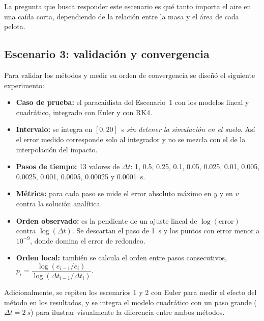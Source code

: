La pregunta que busca responder este escenario es qué tanto importa el aire en una caída corta, dependiendo de la relación entre la masa y el área de cada pelota.

\subsection{Escenario 3: validación y convergencia}
\label{sec:diseno-convergencia}

Para validar los métodos y medir su orden de convergencia se diseñó el siguiente experimento:
\begin{itemize}
  \item \textbf{Caso de prueba:} el paracaidista del Escenario~1 con los modelos lineal y cuadrático, integrado con Euler y con RK4.
  \item \textbf{Intervalo:} se integra en $[0, 20]$~s \emph{sin detener la simulación en el suelo}. Así el error medido corresponde solo al integrador y no se mezcla con el de la interpolación del impacto.
  \item \textbf{Pasos de tiempo:} 13 valores de $\Delta t$: 1, 0.5, 0.25, 0.1, 0.05, 0.025, 0.01, 0.005, 0.0025, 0.001, 0.0005, 0.00025 y 0.0001~s.
  \item \textbf{Métrica:} para cada paso se mide el error absoluto máximo en $y$ y en $v$ contra la solución analítica.
  \item \textbf{Orden observado:} es la pendiente de un ajuste lineal de $\log(\text{error})$ contra $\log(\Delta t)$. Se descartan el paso de \qty{1}{s} y los puntos con error menor a $10^{-9}$, donde domina el error de redondeo.
  \item \textbf{Orden local:} también se calcula el orden entre pasos consecutivos,
  $p_i = \dfrac{\log(e_{i-1}/e_i)}{\log(\Delta t_{i-1}/\Delta t_i)}$.
\end{itemize}
Adicionalmente, se repiten los escenarios 1 y 2 con Euler para medir el efecto del método en los resultados, y se integra el modelo cuadrático con un paso grande ($\Delta t = \qty{2}{s}$) para ilustrar visualmente la diferencia entre ambos métodos.

